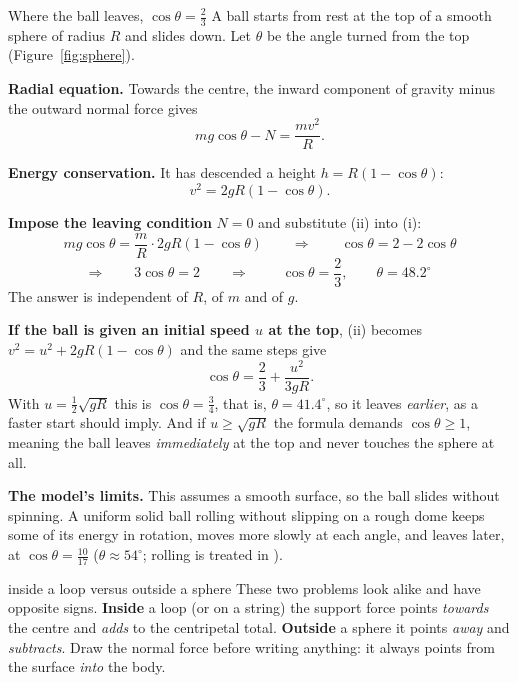 \begin{derivbox}{Where the ball leaves, $\cos\theta=\tfrac{2}{3}$}
A ball starts from rest at the top of a smooth sphere of radius $R$ and slides down. Let $\theta$ be the
angle turned from the top (Figure~\ref{fig:sphere}).

 \textbf{Radial equation.} Towards the centre, the inward component of gravity minus the
outward normal force gives
\[
mg\cos\theta-N=\frac{mv^{2}}{R}. \tag{i}
\]

 \textbf{Energy conservation.} It has descended a height $h=R(1-\cos\theta)$:
\[
v^{2}=2gR(1-\cos\theta). \tag{ii}
\]

 \textbf{Impose the leaving condition} $N=0$ and substitute (ii) into (i):
\[
mg\cos\theta=\frac{m}{R}\cdot2gR(1-\cos\theta)
\qquad\Longrightarrow\qquad
\cos\theta=2-2\cos\theta
\]
\[
\Longrightarrow\qquad
3\cos\theta=2
\qquad\Longrightarrow\qquad
\boxed{\;\cos\theta=\frac{2}{3},\qquad \theta=48.2^\circ\;}
\]
The answer is independent of $R$, of $m$ and of $g$.

 \textbf{If the ball is given an initial speed $u$ at the top}, (ii) becomes
$v^{2}=u^{2}+2gR(1-\cos\theta)$ and the same steps give
\[
\cos\theta=\frac{2}{3}+\frac{u^{2}}{3gR}.
\]
With $u=\tfrac{1}{2}\sqrt{gR}$ this is $\cos\theta=\tfrac{3}{4}$, that is, $\theta=41.4^\circ$, so it leaves
\emph{earlier}, as a faster start should imply. And if $u\ge\sqrt{gR}$ the formula demands
$\cos\theta\ge1$, meaning the ball leaves \emph{immediately} at the top and never touches the sphere at
all.

\smallskip
\textbf{The model's limits.} This assumes a smooth surface, so the ball slides without spinning. A
uniform solid ball rolling without slipping on a rough dome keeps some of its energy in rotation, moves
more slowly at each angle, and leaves later, at $\cos\theta=\tfrac{10}{17}$ ($\theta\approx54^\circ$;
rolling is treated in ).
\end{derivbox}

\begin{trapbox}{inside a loop versus outside a sphere}
These two problems look alike and have opposite signs. \textbf{Inside} a loop (or on a string) the
support force points \emph{towards} the centre and \emph{adds} to the centripetal total. \textbf{Outside}
a sphere it points \emph{away} and \emph{subtracts}. Draw the normal force before writing anything: it
always points from the surface \emph{into} the body.
\end{trapbox}

